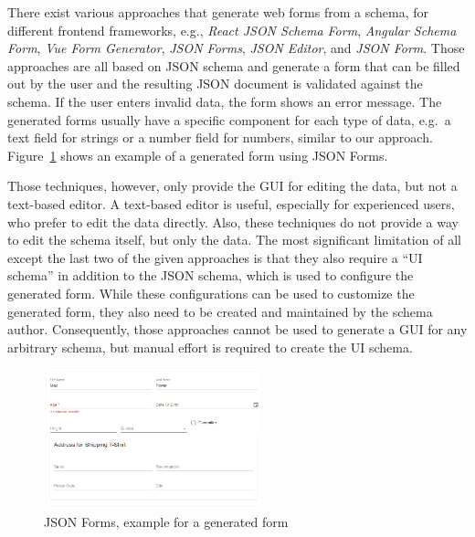 There exist various approaches that generate web forms from a schema, for different frontend frameworks, e.g.,
\textit{React JSON Schema Form}\cite{githubGitHubRjsfteamreactjsonschemaform},
\textit{Angular Schema Form}\cite{githubGitHubJsonschemaformangularschemaform},
\textit{Vue Form Generator}\cite{githubGitHubVuegeneratorsvueformgenerator},
\textit{JSON Forms}\cite{jsonformsMoreForms},
\textit{JSON Editor}\cite{jsoneditoronlineJSONEditor}, and
\textit{JSON Form}\cite{githubGitHubJsonformjsonform}.
Those approaches are all based on JSON schema and generate a form that can be filled out by the user and
the resulting JSON document is validated against the schema.
If the user enters invalid data, the form shows an error message.
The generated forms usually have a specific component for each type of data, e.g.\ a text field for strings or a number field for numbers,
similar to our approach.
Figure~\ref{fig:jsonforms} shows an example of a generated form using JSON Forms.

Those techniques, however, only provide the GUI for editing the data, but not a text-based editor.
A text-based editor is useful, especially for experienced users, who prefer to edit the data directly.
Also, these techniques do not provide a way to edit the schema itself, but only the data.
The most significant limitation of all except the last two of the given approaches is that they also require a ``UI schema'' in addition to the JSON schema, which is used to configure the generated form.
While these configurations can be used to customize the generated form, they also need to be created and maintained by the schema author.
Consequently, those approaches cannot be used to generate a GUI for any arbitrary schema, but manual effort is required to create the UI schema.

\begin{figure}[htb]
    \centering
    \includegraphics[width=2.5in]{figures/jsonforms}
    \caption{JSON Forms, example for a generated form}
    \label{fig:jsonforms}
\end{figure}

